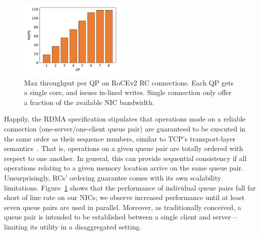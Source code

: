 
\begin{figure}[t] \includegraphics[width=0.45\textwidth]{fig/qp_bottleneck.pdf}

\caption{Max throughput per QP on RoCEv2 RC connections. Each QP gets a single
core, and issues in-lined writes. Single connection only offer a fraction of the
available NIC bandwidth.} 

\label{fig:qp_bottleneck} \end{figure}

Happily, the RDMA specification stipulates that operations made on a
reliable connection (one-server/one-client queue pair) are guaranteed
to be executed in the same order as their sequence numbers, similar to
TCP's transport-layer semantics~\cite{infiniband-spec}.
That is, operations on a given queue pair
are totally ordered with respect to one another.
In general, this can provide sequential consistency if all operations
relating to a given memory location arrive on the same queue pair.
Unsurprisingly, RCs' ordering guarantee comes with its own
scalability limitations.  Figure~\ref{fig:qp_bottleneck} shows that
the performance of individual queue pairs fall far short of line
rate on our NICs; we observe increased performance until at least
seven queue pairs are used in parallel.  Moreover, as traditionally
conceived, a queue pair is intended to be established between a single
client and server---limiting its utility in a disaggregated setting.

